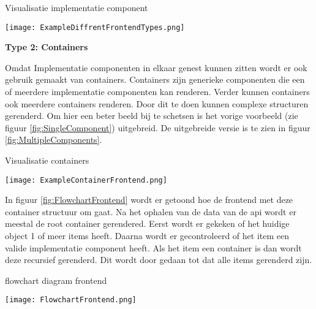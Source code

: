 \begin{graphic}
    \captionsetup{type=figure}
    \caption{Visualisatie implementatie component}
    \texttt{[image: ExampleDiffrentFrontendTypes.png]}
    \label{fig:SingleComponent}
\end{graphic}

\whitespace[2]
\textbf{Type 2: Containers}

\whitespace
Omdat Implementatie componenten in elkaar genest kunnen zitten wordt er ook gebruik gemaakt van containers.
Containers zijn generieke componenten die een of meerdere implementatie componenten kan renderen.
Verder kunnen containers ook meerdere containers renderen.
Door dit te doen kunnen complexe structuren gerenderd.
Om hier een beter beeld bij te schetsen is het vorige voorbeeld (zie figuur \ref{fig:SingleComponent}) uitgebreid.
De uitgebreide versie is te zien in figuur \ref{fig:MultipleComponents}.

\whitespace
\begin{graphic}
    \captionsetup{type=figure}
    \caption{Visualisatie containers}
    \texttt{[image: ExampleContainerFrontend.png]}
    \label{fig:MultipleComponents}
\end{graphic}

\newpage
In figuur \ref{fig:FlowchartFrontend} wordt er getoond hoe de frontend met deze container structuur om gaat.
Na het ophalen van de data van de api wordt er meestal de root container gerendered.
Eerst wordt er gekeken of het huidige object 1 of meer items heeft.
Daarna wordt er gecontroleerd of het item een valide implementatie component heeft.
Als het item een container is dan wordt deze recursief gerenderd.
Dit wordt door gedaan tot dat alle items gerenderd zijn.

\whitespace
\begin{graphic}
    \captionsetup{type=figure}
    \caption{flowchart diagram frontend}
    \texttt{[image: FlowchartFrontend.png]}
    \label{fig:FlowchartFrontend}
\end{graphic}
